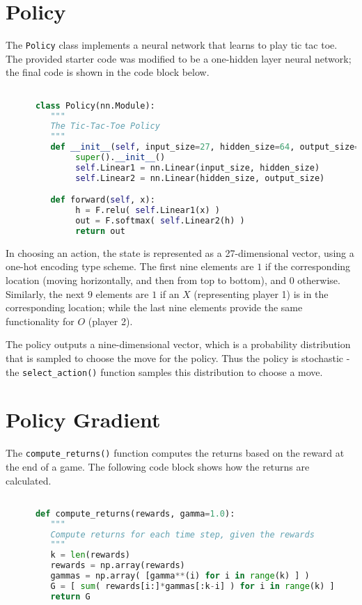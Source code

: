 \documentclass{article}
\begin{document}
   \section{Policy}
   The \texttt{Policy} class implements a neural network that learns to play tic tac toe. The provided
   starter code was modified to be a one-hidden layer neural network; the final code is shown in the
   code block below.
   \begin{lstlisting}[language=Python, label={PolicyClass}]

      class Policy(nn.Module):
         """
         The Tic-Tac-Toe Policy
         """
         def __init__(self, input_size=27, hidden_size=64, output_size=9):
              super().__init__()
              self.Linear1 = nn.Linear(input_size, hidden_size)
              self.Linear2 = nn.Linear(hidden_size, output_size)

         def forward(self, x):
              h = F.relu( self.Linear1(x) )
              out = F.softmax( self.Linear2(h) )
              return out
   \end{lstlisting}

   In choosing an action, the state is represented as a 27-dimensional vector, using a one-hot encoding
   type scheme. The first nine elements are $1$ if the corresponding location (moving horizontally, and then
   from top to bottom), and $0$ otherwise. Similarly, the next $9$ elements are $1$ if an $X$ (representing
   player 1) is in the corresponding location; while the last nine elements provide the same functionality
   for $O$ (player 2).

   The policy outputs a nine-dimensional vector, which is a probability distribution that is sampled to choose
   the move for the policy. Thus the policy is stochastic - the \texttt{select\_action()} function samples this
   distribution to choose a move.


   \section{Policy Gradient}
   The \texttt{compute\_returns()} function computes the returns based on the reward at the end of a game.
   The following code block shows how the returns are calculated.
   \begin{lstlisting}[language=Python, label={PolicyClass}]

      def compute_returns(rewards, gamma=1.0):
         """
         Compute returns for each time step, given the rewards
         """
         k = len(rewards)
         rewards = np.array(rewards)
         gammas = np.array( [gamma**(i) for i in range(k) ] )
         G = [ sum( rewards[i:]*gammas[:k-i] ) for i in range(k) ]
         return G
   \end{lstlisting}
\end{document}
